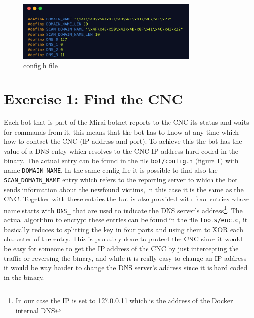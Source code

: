 \begin{figure}
    \centering
    \includegraphics[width=0.8\textwidth]{resources/images/config.png}
    \caption{config.h file}
    \label{fig:config_h}
\end{figure}
\section{Exercise 1: Find the CNC}
\label{section:ex1}
Each bot that is part of the Mirai botnet reports to the CNC its status and waits for commands from it, this means that the bot has to know at any time which how to contact the CNC (IP address and port). To achieve this the bot has the value of a DNS entry which resolves to the CNC IP address hard coded in the binary. The actual entry can be found in the file \texttt{bot/config.h} (figure \ref{fig:config_h}) with name \texttt{DOMAIN\_NAME}. In the same config file it is possible to find also the \texttt{SCAN\_DOMAIN\_NAME} entry which refers to the reporting server to which the bot sends information about the newfound victims, in this case it is the same as the CNC. Together with these entries the bot is also provided with four entries whose name starts with \texttt{DNS\_} that are used to indicate the DNS server's address\footnote{In our case the IP is set to 127.0.0.11 which is the address of the Docker internal DNS}. The actual algorithm to encrypt these entries can be found in the file \texttt{tools/enc.c}, it basically reduces to splitting the key in four parts and using them to XOR each character of the entry. This is probably done to protect the CNC since it would be easy for someone to get the IP address of the CNC by just intercepting the traffic or reversing the binary, and while it is really easy to change an IP address it would be way harder to change the DNS server's address since it is hard coded in the binary.

